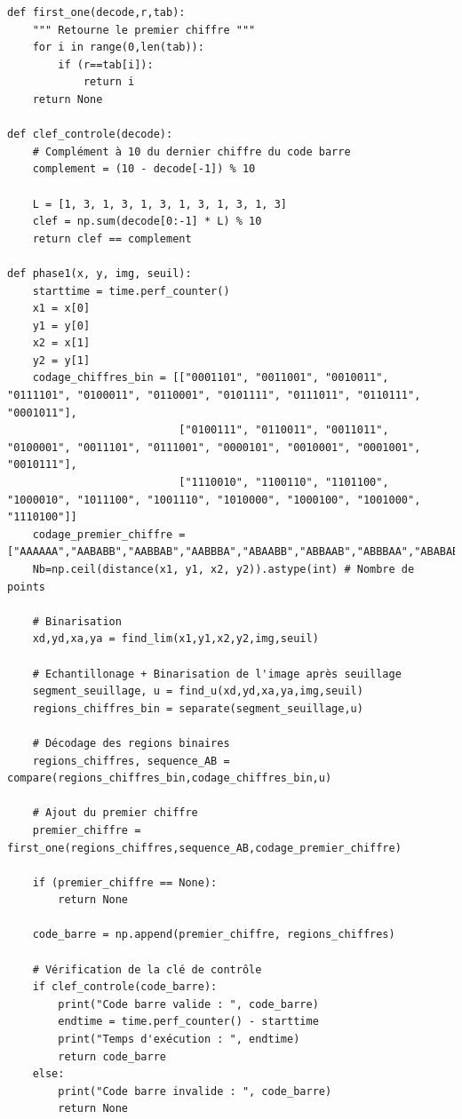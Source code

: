 \documentclass{rapport}
\begin{document}
\begin{lstlisting}
def first_one(decode,r,tab):
    """ Retourne le premier chiffre """
    for i in range(0,len(tab)):
        if (r==tab[i]):
            return i
    return None

def clef_controle(decode):
    # Complément à 10 du dernier chiffre du code barre
    complement = (10 - decode[-1]) % 10

    L = [1, 3, 1, 3, 1, 3, 1, 3, 1, 3, 1, 3]
    clef = np.sum(decode[0:-1] * L) % 10
    return clef == complement

def phase1(x, y, img, seuil):
    starttime = time.perf_counter()
    x1 = x[0]
    y1 = y[0]
    x2 = x[1]
    y2 = y[1]
    codage_chiffres_bin = [["0001101", "0011001", "0010011", "0111101", "0100011", "0110001", "0101111", "0111011", "0110111", "0001011"],
                           ["0100111", "0110011", "0011011", "0100001", "0011101", "0111001", "0000101", "0010001", "0001001", "0010111"],
                           ["1110010", "1100110", "1101100", "1000010", "1011100", "1001110", "1010000", "1000100", "1001000", "1110100"]]
    codage_premier_chiffre = ["AAAAAA","AABABB","AABBAB","AABBBA","ABAABB","ABBAAB","ABBBAA","ABABAB","ABABBA","ABBABA"]
    Nb=np.ceil(distance(x1, y1, x2, y2)).astype(int) # Nombre de points
    
    # Binarisation
    xd,yd,xa,ya = find_lim(x1,y1,x2,y2,img,seuil)
    
    # Echantillonage + Binarisation de l'image après seuillage 
    segment_seuillage, u = find_u(xd,yd,xa,ya,img,seuil)
    regions_chiffres_bin = separate(segment_seuillage,u)
    
    # Décodage des regions binaires
    regions_chiffres, sequence_AB = compare(regions_chiffres_bin,codage_chiffres_bin,u)
    
    # Ajout du premier chiffre
    premier_chiffre = first_one(regions_chiffres,sequence_AB,codage_premier_chiffre)
    
    if (premier_chiffre == None):
        return None
    
    code_barre = np.append(premier_chiffre, regions_chiffres)
    
    # Vérification de la clé de contrôle
    if clef_controle(code_barre):
        print("Code barre valide : ", code_barre)
        endtime = time.perf_counter() - starttime
        print("Temps d'exécution : ", endtime)
        return code_barre
    else:
        print("Code barre invalide : ", code_barre)
        return None 

\end{lstlisting}
\end{document}

